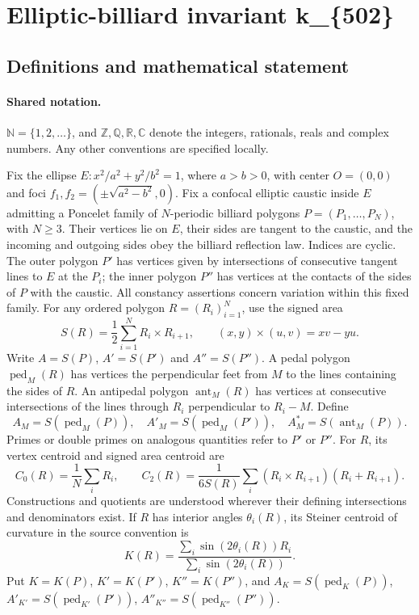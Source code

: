 \documentclass[11pt]{article}
\begin{document}
\section{Elliptic-billiard invariant k\_\{502\}}\label{statement}

\subsection{Definitions and mathematical statement}

\paragraph{Shared notation.}$\mathbb N=\{1,2,\ldots\}$, and $\mathbb Z,\mathbb Q,\mathbb R,\mathbb C$ denote the integers, rationals, reals and complex numbers. Any other conventions are specified locally.


Fix the ellipse $E:x^2/a^2+y^2/b^2=1$, where $a>b>0$, with center $O=(0,0)$ and foci $f_1,f_2=(\pm\sqrt{a^2-b^2},0)$. Fix a confocal elliptic caustic inside $E$ admitting a Poncelet family of $N$-periodic billiard polygons $P=(P_1,\ldots,P_N)$, with $N\geq3$. Their vertices lie on $E$, their sides are tangent to the caustic, and the incoming and outgoing sides obey the billiard reflection law. Indices are cyclic. The outer polygon $P'$ has vertices given by intersections of consecutive tangent lines to $E$ at the $P_i$; the inner polygon $P''$ has vertices at the contacts of the sides of $P$ with the caustic. All constancy assertions concern variation within this fixed family.
For any ordered polygon $R=(R_i)_{i=1}^N$, use the signed area
\[S(R)=\frac12\sum_{i=1}^N R_i\times R_{i+1},\qquad (x,y)\times(u,v)=xv-yu.\]
Write $A=S(P)$, $A'=S(P')$ and $A''=S(P'')$. A pedal polygon $\operatorname{ped}_M(R)$ has vertices the perpendicular feet from $M$ to the lines containing the sides of $R$. An antipedal polygon $\operatorname{ant}_M(R)$ has vertices at consecutive intersections of the lines through $R_i$ perpendicular to $R_i-M$. Define
\[A_M=S(\operatorname{ped}_M(P)),\quad A'_M=S(\operatorname{ped}_M(P')),\quad A_M^*=S(\operatorname{ant}_M(P)).\]
Primes or double primes on analogous quantities refer to $P'$ or $P''$. For $R$, its vertex centroid and signed area centroid are
\[C_0(R)=\frac1N\sum_i R_i,\qquad C_2(R)=\frac{1}{6S(R)}\sum_i(R_i\times R_{i+1})(R_i+R_{i+1}).\]
Constructions and quotients are understood wherever their defining intersections and denominators exist.
If $R$ has interior angles $\theta_i(R)$, its Steiner centroid of curvature in the source convention is
\[K(R)=\frac{\sum_i\sin(2\theta_i(R))R_i}{\sum_i\sin(2\theta_i(R))}.\]
Put $K=K(P)$, $K'=K(P')$, $K''=K(P'')$, and $A_K=S(\operatorname{ped}_K(P))$, $A'_{K'}=S(\operatorname{ped}_{K'}(P'))$, $A''_{K''}=S(\operatorname{ped}_{K''}(P''))$.
\end{document}
